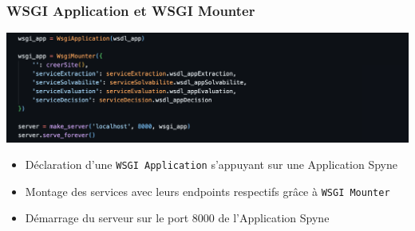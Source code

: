 \documentclass{article}
\begin{document}
      \subsubsection{WSGI Application et WSGI Mounter}
        \includegraphics[width=\textwidth]{Images/7.3/wsgiApp_serveur.png}\\
        \begin{itemize}
            \item Déclaration d'une \texttt{WSGI Application} s'appuyant sur une Application Spyne
            \item Montage des services avec leurs endpoints respectifs grâce à \texttt{WSGI Mounter}
            \item Démarrage du serveur sur le port 8000 de l'Application Spyne
        \end{itemize}
\end{document}
